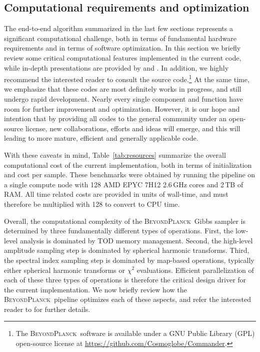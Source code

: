 \documentclass[twocolumn]{aa}
\newcommand{\BP}{\textsc{BeyondPlanck}}
\begin{document}
\subsection{Computational requirements and optimization}
\label{sec:compcost}


The end-to-end algorithm summarized in the last few sections
represents a significant computational challenge, both in terms of
fundamental hardware requirements and in terms of software
optimization. In this section we briefly review some critical
computational features implemented in the current code, while in-depth
presentations are provided by \citet{bp03} and \citet{bp05}. In
addition, we highly recommend the interested reader to consult the
source code.\footnote{The \BP\ software is available under a GNU
  Public Library (GPL) open-source license at
  \url{https://github.com/Cosmoglobe/Commander}.} At the same time, we
emphasize that these codes are most definitely works in progress, and
still undergo rapid development. Nearly every single component and
function have room for further improvement and optimization. However,
it is our hope and intention that by providing all codes to the
general community under an open-source license, new collaborations,
efforts and ideas will emerge, and this will leading to more mature,
efficient and generally applicable code.

With these caveats in mind, Table~\ref{tab:resources} summarize the
overall computational cost of the current implementation, both in
terms of initialization and cost per sample. These benchmarks were
obtained by running the pipeline on a single compute node with 128
AMD EPYC 7H12 2.6\,GHz cores and 2\,TB of RAM. All time
related costs are provided in units of wall-time, and must therefore
be multiplied with 128 to convert to CPU time.

Overall, the computational complexity of the \BP\ Gibbs sampler is
determined by three fundamentally different types of
operations. First, the low-level analysis is dominated by TOD memory
management. Second, the high-level amplitude sampling step is
dominated by spherical harmonic transforms. Third, the spectral index
sampling step is dominated by map-based operations, typically either
spherical harmonic transforms or $\chi^2$ evaluations. Efficient
parallelization of each of these three types of operations is
therefore the critical design driver for the current implementation. We
now briefly review how the \BP\ pipeline optimizes each of these
aspects, and refer the interested reader to \citet{bp03} for further
details.
\end{document}

